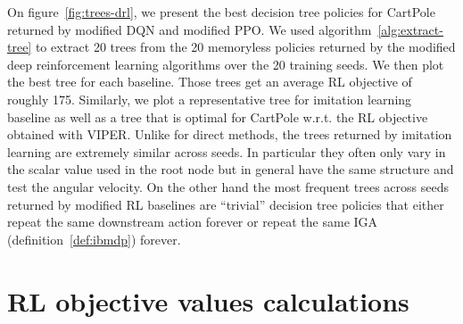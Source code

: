 On figure~\ref{fig:trees-drl}, we present the best decision tree policies for CartPole returned by modified DQN and modified PPO.
We used algorithm~\ref{alg:extract-tree} to extract 20 trees from the 20 memoryless policies returned by the modified deep reinforcement learning algorithms over the 20 training seeds.
We then plot the best tree for each baseline.
Those trees get an average RL objective of roughly 175.
Similarly, we plot a representative tree for imitation learning baseline as well as a tree that is optimal for CartPole w.r.t. the RL objective obtained with VIPER. 
Unlike for direct methods, the trees returned by imitation learning are extremely similar across seeds. In particular they often only vary in the scalar value used in the root node but in general have the same structure and test the angular velocity.
On the other hand the most frequent trees across seeds returned by modified RL baselines are ``trivial'' decision tree policies that either repeat the same downstream action forever or repeat the same IGA (definition~\ref{def:ibmdp}) forever.

\section{RL objective values calculations}\label{calcs}
